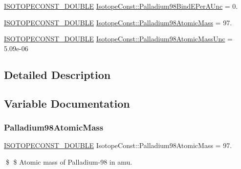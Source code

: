 \begin{DoxyCompactItemize}
\mbox{\hyperlink{group___isotope_const-_macros_ga8f45a7272ce02c0b4c65c44636ed719a}{I\+S\+O\+T\+O\+P\+E\+C\+O\+N\+S\+T\+\_\+\+D\+O\+U\+B\+LE}} \mbox{\hyperlink{group___isotope_const-_palladium-_pd98_gac32aa1f365f5cb4bf38c6ab89b693fd6}{Isotope\+Const\+::\+Palladium98\+Bind\+E\+Per\+A\+Unc}} = 0.
\item 
\mbox{\hyperlink{group___isotope_const-_macros_ga8f45a7272ce02c0b4c65c44636ed719a}{I\+S\+O\+T\+O\+P\+E\+C\+O\+N\+S\+T\+\_\+\+D\+O\+U\+B\+LE}} \mbox{\hyperlink{group___isotope_const-_palladium-_pd98_ga9b769bc0784b08b26cc23ac0b0dbfab3}{Isotope\+Const\+::\+Palladium98\+Atomic\+Mass}} = 97.
\item 
\mbox{\hyperlink{group___isotope_const-_macros_ga8f45a7272ce02c0b4c65c44636ed719a}{I\+S\+O\+T\+O\+P\+E\+C\+O\+N\+S\+T\+\_\+\+D\+O\+U\+B\+LE}} \mbox{\hyperlink{group___isotope_const-_palladium-_pd98_ga41b54d00955df2e4279ce16996b02de2}{Isotope\+Const\+::\+Palladium98\+Atomic\+Mass\+Unc}} = 5.\+09e-\/06
\end{DoxyCompactItemize}


\subsection{Detailed Description}


\subsection{Variable Documentation}
\mbox{\label{group___isotope_const-_palladium-_pd98_ga9b769bc0784b08b26cc23ac0b0dbfab3}} 
\subsubsection{\texorpdfstring{Palladium98\+Atomic\+Mass}{Palladium98AtomicMass}}
{\footnotesize\ttfamily \mbox{\hyperlink{group___isotope_const-_macros_ga8f45a7272ce02c0b4c65c44636ed719a}{I\+S\+O\+T\+O\+P\+E\+C\+O\+N\+S\+T\+\_\+\+D\+O\+U\+B\+LE}} Isotope\+Const\+::\+Palladium98\+Atomic\+Mass = 97.}

\$ \$ Atomic mass of Palladium-\/98 in amu. \mbox{\label{group___isotope_const-_palladium-_pd98_ga41b54d00955df2e4279ce16996b02de2}} 
